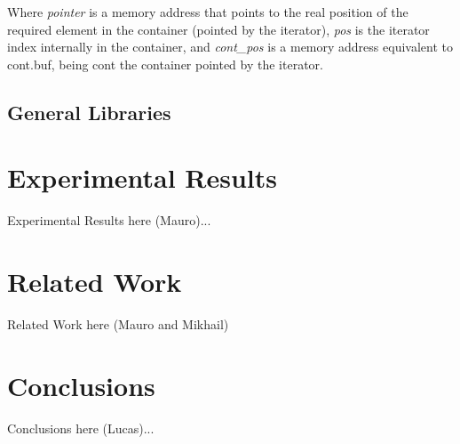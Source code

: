 \documentclass[a4paper]{llncs}
\begin{document}
	Where \textit{pointer} is a memory address that points to the real position of the required element in the container (pointed by the iterator), \textit{pos} is the iterator index internally in the container, and \textit{cont\_pos} is a memory address equivalent to cont.buf, being cont the container pointed by the iterator.

%
\subsection{General Libraries}


\section{Experimental Results}
%
Experimental Results here (Mauro)...



\section{Related Work}
%
Related Work here (Mauro and Mikhail)

\section{Conclusions}
%
Conclusions here (Lucas)...


\end{document}
